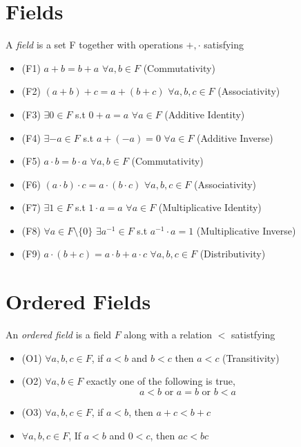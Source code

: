 \documentclass[openany]{report}
\begin{document}
\section{Fields}
\begin{definition}
    A \emph{field} is a set F together with operations $+,\cdot$ satisfying
    \begin{itemize}
        \item (F1) $a+b=b+a$ $\forall a,b \in F$ (Commutativity)
        \item (F2) $(a + b) + c = a + (b + c)$ $\forall a,b,c \in F$     (Associativity)
        \item (F3) $\exists 0 \in F$ s.t $0 + a = a$ $\forall a \in F$ (Additive Identity)
        \item (F4) $\exists -a \in F$ s.t $a + (-a) = 0$ $\forall a \in F$ (Additive Inverse)
        \item (F5) $a\cdot b = b \cdot a$ $\forall a,b \in F$ (Commutativity)
        \item (F6) $(a \cdot b) \cdot c = a \cdot (b \cdot c)$ $\forall a,b,c \in F$ (Associativity)
        \item (F7) $\exists 1 \in F$ s.t $1 \cdot a = a$ $\forall a \in F$ (Multiplicative Identity)
        \item (F8) $\forall a \in F \setminus \{0\}$ $\exists a^{-1} \in F$ s.t $a^{-1} \cdot a = 1$ (Multiplicative Inverse)
        \item (F9) $a \cdot (b + c) = a \cdot b + a \cdot c$ $\forall a,b,c \in F$ (Distributivity)
    \end{itemize}
\end{definition}

\section{Ordered Fields}

\begin{definition}
    An \emph{ordered field} is a field $F$ along with a relation $<$ satistfying
    \begin{itemize}
        \item (O1) $\forall a,b,c \in F$, if  $a < b$ and $b < c$ then $a<c$ (Transitivity)
        \item (O2) $\forall a,b \in F$ exactly one of the following is true,
        \[a < b \text{ or } a = b \text{ or } b < a\]
        \item (O3) $\forall a,b,c \in F$, if $a < b$, then $a + c < b + c$
        \item $\forall a,b,c \in F$, If $a < b$ and $0 < c$, then $ac < bc$
    \end{itemize}
\end{definition}
\end{document}
